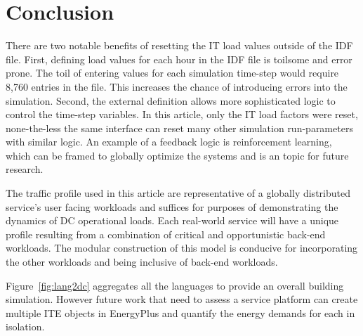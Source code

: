 {%
}


\section*{Conclusion}
There are two notable benefits of resetting the IT load values outside of the IDF file. First, defining load values for each hour in the IDF file is toilsome and error prone. The toil of entering values for each simulation time-step would require 8,760 entries in the file. This increases the chance of introducing errors into the simulation. Second, the external definition allows more sophisticated logic to control the time-step variables. In this article, only the IT load factors were reset, none-the-less the same interface can reset many other simulation run-parameters with similar logic. An example of a feedback logic is reinforcement learning, which can be framed to globally optimize the systems and is an topic for future research. 

The traffic profile used in this article are representative of a globally distributed service’s user facing workloads and suffices for purposes of demonstrating the dynamics of DC operational loads. Each real-world service will have a unique profile resulting from a combination of critical and opportunistic back-end workloads. The modular construction of this model is conducive for incorporating the other workloads and being inclusive of back-end workloads.

Figure~\ref{fig:lang2dc} aggregates all the languages to provide an overall building simulation. However future work that need to assess a service platform can create multiple ITE objects in EnergyPlus and quantify the energy demands for each in isolation.